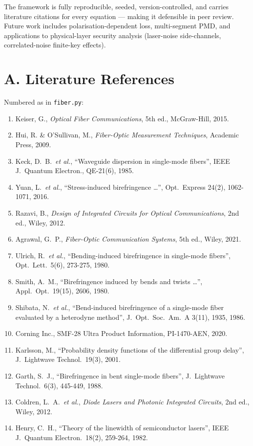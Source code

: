 \documentclass[11pt,a4paper]{article}
\begin{document}
The framework is fully reproducible, seeded, version-controlled, and
carries literature citations for every equation --- making it defensible
in peer review.  Future work includes polarisation-dependent loss,
multi-segment PMD, and applications to physical-layer security analysis
(laser-noise side-channels, correlated-noise finite-key effects).

\appendix
\section{A. Literature References}

Numbered as in \texttt{fiber.py}:

\begin{enumerate}
  \item Keiser, G., \textit{Optical Fiber Communications}, 5th ed.,
    McGraw-Hill, 2015.
  \item Hui, R. \& O'Sullivan, M., \textit{Fiber-Optic Measurement
    Techniques}, Academic Press, 2009.
  \item Keck, D.~B.\ \textit{et al.}, \enquote{Waveguide dispersion in
    single-mode fibers}, IEEE J.\ Quantum Electron., QE-21(6), 1985.
  \item Yuan, L.\ \textit{et al.}, \enquote{Stress-induced birefringence
    \ldots}, Opt.\ Express 24(2), 1062-1071, 2016.
  \item Razavi, B., \textit{Design of Integrated Circuits for Optical
    Communications}, 2nd ed., Wiley, 2012.
  \item Agrawal, G.~P., \textit{Fiber-Optic Communication Systems},
    5th ed., Wiley, 2021.
  \item Ulrich, R.\ \textit{et al.}, \enquote{Bending-induced birefringence
    in single-mode fibers}, Opt.\ Lett.\ 5(6), 273-275, 1980.
  \item Smith, A.~M., \enquote{Birefringence induced by bends and twists
    \ldots}, Appl.\ Opt.\ 19(15), 2606, 1980.
  \item Shibata, N.\ \textit{et al.}, \enquote{Bend-induced birefringence
    of a single-mode fiber evaluated by a heterodyne method},
    J.\ Opt.\ Soc.\ Am.\ A 3(11), 1935, 1986.
  \item Corning Inc., SMF-28 Ultra Product Information, PI-1470-AEN, 2020.
  \item Karlsson, M., \enquote{Probability density functions of the
    differential group delay}, J.\ Lightwave Technol.\ 19(3), 2001.
  \item Garth, S.~J., \enquote{Birefringence in bent single-mode fibers},
    J.\ Lightwave Technol.\ 6(3), 445-449, 1988.
  \item Coldren, L.~A.\ \textit{et al.}, \textit{Diode Lasers and Photonic
    Integrated Circuits}, 2nd ed., Wiley, 2012.
  \item Henry, C.~H., \enquote{Theory of the linewidth of semiconductor
    lasers}, IEEE J.\ Quantum Electron.\ 18(2), 259-264, 1982.
\end{enumerate}
\end{document}
